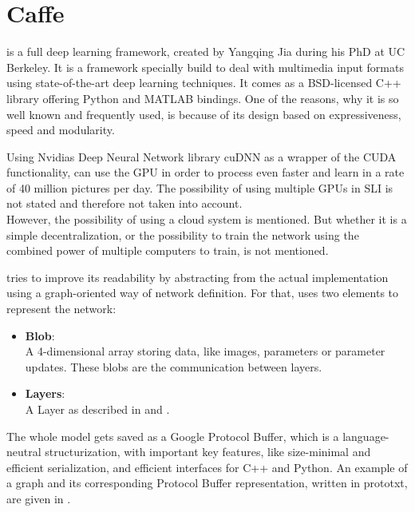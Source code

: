 \section{Caffe} \label{sec: Caffe}


\caffe is a full deep learning framework, created by Yangqing Jia during his PhD at UC Berkeley. It is a framework specially build to deal with multimedia input formats using state-of-the-art deep learning techniques. It comes as a BSD-licensed C++ library offering Python and MATLAB bindings. One of the reasons, why it is so well known and frequently used, is because of its design based on expressiveness, speed and modularity.

Using Nvidias Deep Neural Network library cuDNN as a wrapper of the CUDA functionality, \caffe can use the GPU in order to process even faster and learn in a rate of 40 million pictures per day. The possibility of using multiple GPUs in SLI is not stated and therefore not taken into account. \cite{CaffeAndcuDNN}\\
However, the possibility of using a cloud system is mentioned. But whether it is a simple decentralization, or the possibility to train the network using the combined power of multiple computers to train, is not mentioned. \cite{jia2014caffe}

\caffe tries to improve its readability by abstracting from the actual implementation using a graph-oriented way of network definition. For that, \caffe uses two elements to represent the network:
\begin{itemize}
	\item \textbf{Blob}:\\
		A 4-dimensional array storing data, like images, parameters or parameter updates. These blobs are the communication between layers.
	\item \textbf{Layers}:\\
		A Layer as described in  and .
\end{itemize}
The whole model gets saved as a Google Protocol Buffer, which is a language-neutral structurization, with important key features, like size-minimal and efficient serialization, and efficient interfaces for C++ and Python. \cite{jia2014caffe} \cite{varda2008protocol}
An example of a graph and its corresponding Protocol Buffer representation, written in prototxt, are given in .



